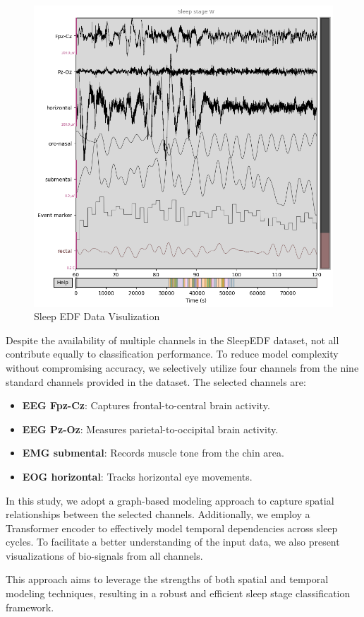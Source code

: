 \begin{figure}[!h]
    \centering
    \includegraphics[width=0.5\linewidth]{img/Sleep EDF Data Visulization.png}
    \caption{Sleep EDF Data Visulization}
    \label{fig:enter-label}
\end{figure}

Despite the availability of multiple channels in the SleepEDF dataset, not all contribute equally to classification performance. To reduce model complexity without compromising accuracy, we selectively utilize four channels from the nine standard channels provided in the dataset. The selected channels are:

\begin{itemize}
    \item \textbf{EEG Fpz-Cz}: Captures frontal-to-central brain activity.  
    \item \textbf{EEG Pz-Oz}: Measures parietal-to-occipital brain activity.  
    \item \textbf{EMG submental}: Records muscle tone from the chin area.  
    \item \textbf{EOG horizontal}: Tracks horizontal eye movements.  
\end{itemize}

In this study, we adopt a graph-based modeling approach to capture spatial relationships between the selected channels. Additionally, we employ a Transformer encoder to effectively model temporal dependencies across sleep cycles. To facilitate a better understanding of the input data, we also present visualizations of bio-signals from all channels.

This approach aims to leverage the strengths of both spatial and temporal modeling techniques, resulting in a robust and efficient sleep stage classification framework.

